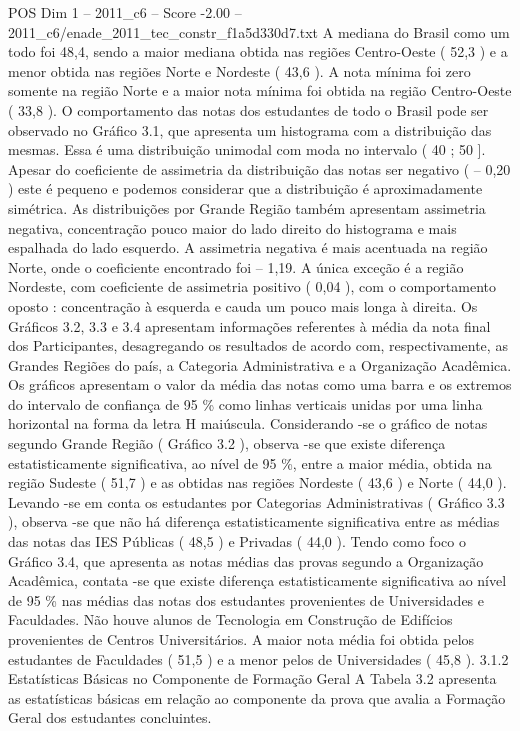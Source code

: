 \begin{textsample}{POS Dim 1 – 2011\_c6 – Score -2.00 – 2011\_c6/enade\_2011\_tec\_constr\_f1a5d330d7.txt}
A mediana do Brasil como um todo foi 48,4, sendo a maior mediana obtida nas regiões Centro-Oeste ( 52,3 ) e a menor obtida nas regiões Norte e Nordeste ( 43,6 ).
A nota mínima foi zero somente na região Norte e a maior nota mínima foi obtida na região Centro-Oeste ( 33,8 ).
O comportamento das notas dos estudantes de todo o Brasil pode ser observado no Gráfico 3.1, que apresenta um histograma com a distribuição das mesmas.
Essa é uma distribuição unimodal com moda no intervalo ( 40 ; 50 ].
Apesar do coeficiente de assimetria da distribuição das notas ser negativo ( – 0,20 ) este é pequeno e podemos considerar que a distribuição é aproximadamente simétrica.
As distribuições por Grande Região também apresentam assimetria negativa, concentração pouco maior do lado direito do histograma e mais espalhada do lado esquerdo.
A assimetria negativa é mais acentuada na região Norte, onde o coeficiente encontrado foi – 1,19.
A única exceção é a região Nordeste, com coeficiente de assimetria positivo ( 0,04 ), com o comportamento oposto : concentração à esquerda e cauda um pouco mais longa à direita.
Os Gráficos 3.2, 3.3 e 3.4 apresentam informações referentes à média da nota final dos Participantes, desagregando os resultados de acordo com, respectivamente, as Grandes Regiões do país, a Categoria Administrativa e a Organização Acadêmica.
Os gráficos apresentam o valor da média das notas como uma barra e os extremos do intervalo de confiança de 95 \% como linhas verticais unidas por uma linha horizontal na forma da letra H maiúscula.
Considerando -se o gráfico de notas segundo Grande Região ( Gráfico 3.2 ), observa -se que existe diferença estatisticamente significativa, ao nível de 95 \%, entre a maior média, obtida na região Sudeste ( 51,7 ) e as obtidas nas regiões Nordeste ( 43,6 ) e Norte ( 44,0 ).
Levando -se em conta os estudantes por Categorias Administrativas ( Gráfico 3.3 ), observa -se que não há diferença estatisticamente significativa entre as médias das notas das IES Públicas ( 48,5 ) e Privadas ( 44,0 ).
Tendo como foco o Gráfico 3.4, que apresenta as notas médias das provas segundo a Organização Acadêmica, contata -se que existe diferença estatisticamente significativa ao nível de 95 \% nas médias das notas dos estudantes provenientes de Universidades e Faculdades.
Não houve alunos de Tecnologia em Construção de Edifícios provenientes de Centros Universitários.
A maior nota média foi obtida pelos estudantes de Faculdades ( 51,5 ) e a menor pelos de Universidades ( 45,8 ). 3.1.2 Estatísticas Básicas no Componente de Formação Geral A Tabela 3.2 apresenta as estatísticas básicas em relação ao componente da prova que avalia a Formação Geral dos estudantes concluintes.

\end{textsample}
